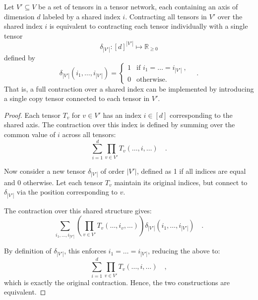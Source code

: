 \documentclass[../../main.tex]{subfiles}
\begin{document}
    \begin{proposition}
        \label{proposition:contracting_over_shared_index}
        Let $V' \subseteq V$ be a set of tensors in a tensor network, each containing an axis of dimension $d$ labeled by a shared index $i$. Contracting all tensors in $V'$ over the shared index $i$ is equivalent to contracting each tensor individually with a single tensor 
        \[
        \delta_{|V'|} : [d]^{|V'|} \mapsto \mathbb{R}_{\geq 0}
        \]
        defined by
        \[
        \delta_{|V'|}(i_1, \dots, i_{|V'|}) = 
        \begin{cases}
        1 & \text{if } i_1 = \dots = i_{|V'|} \ , \\
        0 & \text{otherwise.}
        \end{cases}
        \quad .
        \]
        That is, a full contraction over a shared index can be implemented by introducing a single copy tensor connected to each tensor in $V'$.
    \end{proposition}

    \begin{proof}
    Each tensor $T_v$ for $v \in V'$ has an index \( i \in [d] \) corresponding to the shared axis. The contraction over this index is defined by summing over the common value of \( i \) across all tensors:
    \[
    \sum_{i=1}^d \prod_{v \in V'} T_v(\dots, i, \dots) \quad .
    \]

    Now consider a new tensor \( \delta_{|V'|} \) of order \( |V'| \), defined as 1 if all indices are equal and 0 otherwise. Let each tensor \( T_v \) maintain its original indices, but connect to \( \delta_{|V'|} \) via the position corresponding to \( v \).

    The contraction over this shared structure gives:
    \[
    \sum_{i_1, \dots, i_{|V'|}} \left( \prod_{v \in V'} T_v(\dots, i_v, \dots) \right) \delta_{|V'|}(i_1, \dots, i_{|V'|}) \quad .
    \]

    By definition of \( \delta_{|V'|} \), this enforces \( i_1 = \dots = i_{|V'|} \), reducing the above to:
    \[
    \sum_{i=1}^d \prod_{v \in V'} T_v(\dots, i, \dots) \quad ,
    \]
    which is exactly the original contraction. Hence, the two constructions are equivalent.
    \end{proof}
\end{document}

